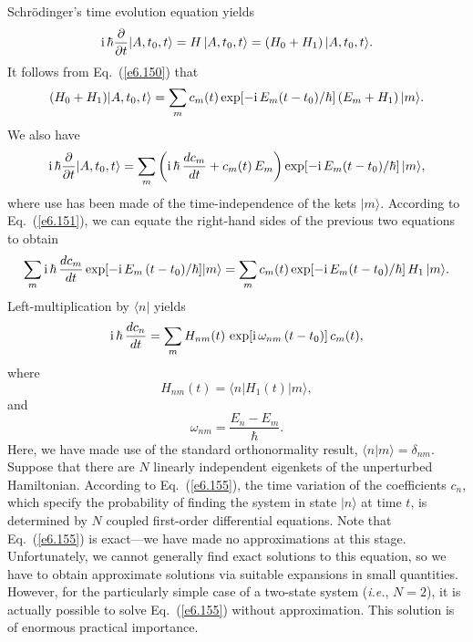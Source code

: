Schr\"{o}dinger's time evolution equation yields
\begin{equation}\label{e6.151}
{\rm i}\,\hbar \frac{\partial}{\partial t}|A, t_0, t\rangle  = 
H\,|A,t_0,t\rangle= (H_0+H_1) \,|A,t_0,t\rangle.
\end{equation}
It follows from Eq.~(\ref{e6.150}) that
\begin{equation}
(H_0+H_1) |A,t_0,t\rangle = \sum_m c_m(t) \exp[-{\rm i}\,E_m (t-t_0)/\hbar]\,
(E_m + H_1)\,|m\rangle.
\end{equation}
We also have
\begin{equation}
{\rm i}\,\hbar \frac{\partial}{\partial t}|A,t_0,t\rangle =
\sum_m \left({\rm i}\,\hbar \,\frac{d c_m}{dt}+ c_m(t)\, E_m\right)
 \exp[-{\rm i}\,E_m (t-t_0)/\hbar]\, |m\rangle,
\end{equation}
where use has been made of the time-independence of the kets
$|m\rangle$. According to Eq.~(\ref{e6.151}), we can equate the right-hand sides
of the previous two equations to obtain
\begin{equation}
\sum_m {\rm i}\,\hbar\, \frac{d c_m}{dt}\exp[-{\rm i}\,E_m \,(t-t_0)/\hbar] |m\rangle = \sum_m c_m(t) \exp[-{\rm i}\,E_m (t-t_0)/\hbar]\,
H_1\, |m\rangle.
\end{equation}
Left-multiplication by $\langle n|$ yields
\begin{equation}\label{e6.155}
{\rm i}\,\hbar\, \frac{d c_n}{dt} = \sum_m H_{nm}(t)\, \exp[{\rm i}\,\omega_{nm}\, (t-t_0)]\,
c_m(t),
\end{equation}
where
\begin{equation}
H_{nm}(t) = \langle n |H_1(t)|m \rangle,
\end{equation}
and
\begin{equation}
\omega_{nm} = \frac{E_n - E_m}{\hbar}.
\end{equation}
Here, we have made use of the standard  orthonormality result, $\langle n|m\rangle
=\delta_{nm}$. Suppose that there are $N$ linearly independent eigenkets
of the unperturbed Hamiltonian. According to Eq.~(\ref{e6.155}), the
time variation of the coefficients $c_n$, which specify the
probability of finding the system in state $|n\rangle$ at time $t$,
is  determined by $N$ coupled first-order differential equations. Note
that Eq.~(\ref{e6.155}) is exact---we have made no approximations at this stage.
Unfortunately, we cannot generally find exact solutions to this equation,
so we have to obtain approximate solutions via suitable expansions  in small
quantities. However, for the particularly simple case of a two-state system
({\em i.e.}, $N=2$), it is actually possible to solve Eq.~(\ref{e6.155}) without
approximation. This
solution is of enormous practical importance. 
 
